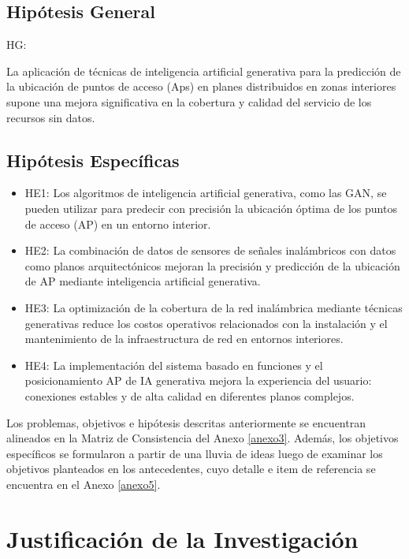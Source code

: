 \subsection{Hipótesis General}
HG: \newcommand{\HipotesisGeneral}{
	La aplicación de técnicas de inteligencia artificial generativa para la predicción de la ubicación de puntos de acceso (Aps) en planes distribuidos en zonas interiores supone una mejora significativa en la cobertura y calidad del servicio de los recursos sin datos.
}
\HipotesisGeneral
\subsection{Hipótesis Específicas}
\newcommand{\Hone}{
	Los algoritmos de inteligencia artificial generativa, como las GAN, se pueden utilizar para predecir con precisión la ubicación óptima de los puntos de acceso (AP) en un entorno interior. 
}
\newcommand{\Htwo}{
	La combinación de datos de sensores de señales inalámbricos con datos como planos arquitectónicos mejoran la precisión y predicción de la ubicación de AP mediante inteligencia artificial generativa.
}
\newcommand{\Hthree}{
	La optimización de la cobertura de la red inalámbrica mediante técnicas generativas reduce los costos operativos relacionados con la instalación y el mantenimiento de la infraestructura de red en entornos interiores.
}
\newcommand{\Hfour}{
	La implementación del sistema basado en funciones y el posicionamiento AP de IA generativa mejora la experiencia del usuario: conexiones estables y de alta calidad en diferentes planos complejos.
}

\begin{itemize}
	\item HE1: \Hone
	\item HE2: \Htwo
	\item HE3: \Hthree
	\item HE4: \Hfour
\end{itemize}

Los problemas, objetivos e hipótesis descritas anteriormente se encuentran alineados en la Matriz de Consistencia del Anexo \ref{anexo3}. Además, los objetivos específicos se formularon a partir de una lluvia de ideas luego de examinar los objetivos planteados en los antecedentes, cuyo detalle e item de referencia se encuentra en el Anexo \ref{anexo5}.

\section{Justificación de la Investigación}

